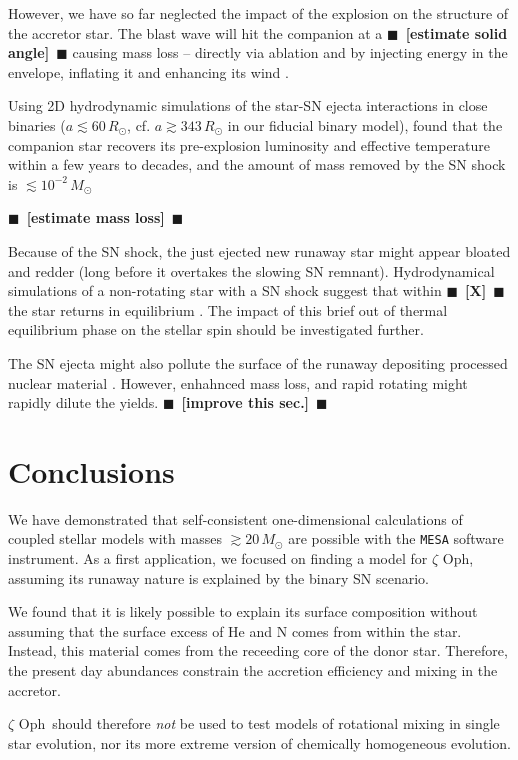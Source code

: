\documentclass[twocolumn,twocolappendix,trackchanges]{aastex63}
\newcommand{\zoph}{$\zeta$ Oph}
\newcommand{\todo}[1]{{\large $\blacksquare$~\textbf{\color{red}[#1]}}~$\blacksquare$}
\begin{document}
However, we have so far neglected the impact of the explosion on the
structure of the accretor star. The blast wave will hit the companion
at a \todo{estimate solid angle} causing mass loss -- directly via
ablation and by injecting energy in the envelope, inflating it and
enhancing its wind \citep{wheeler:75, tauris:98, podsiadlowski:03, hirai:18}.

Using 2D hydrodynamic simulations of the star-SN ejecta interactions
in close binaries ($a\lesssim 60\,R_\odot$,
cf. $a\gtrsim 343\,R_\odot$ in our fiducial binary model),
\cite{hirai:18} found that the companion star recovers its pre-explosion
luminosity and effective temperature within a few years to decades,
and the amount of mass removed by the SN shock is $\lesssim10^{-2}\,M_\odot$



\todo{estimate mass loss}


Because of the SN shock, the just ejected new runaway star might
appear bloated and redder (long before it overtakes the slowing SN
remnant). Hydrodynamical simulations of a non-rotating star
with a SN shock suggest that within \todo{X} the star returns
in equilibrium \cite{hirai:18}. The impact of this brief out of
thermal equilibrium phase on the stellar spin should be investigated
further.

The SN ejecta might also pollute the surface of the runaway depositing
processed nuclear material \citep[e.g.][]{przybilla:08}. However,
enhahnced mass loss, and rapid rotating might rapidly dilute the
yields.
\todo{improve this sec.}
\section{Conclusions}
\label{sec:conclusions}

We have demonstrated that self-consistent one-dimensional calculations
of coupled stellar models with masses $\gtrsim 20\,M_\odot$ are
possible with the \texttt{MESA} software instrument. As a first
application, we focused on finding a model for \zoph, assuming its
runaway nature is explained by the binary SN scenario.

We found that it is likely possible to explain its surface composition
without assuming that the surface excess of He and N comes from within
the star. Instead, this material comes from the receeding core of the
donor star. Therefore, the present day abundances constrain the
accretion efficiency and mixing in the accretor.

\zoph\ should therefore \emph{not} be used to test models of
rotational mixing in single star evolution, nor its more extreme
version of chemically homogeneous evolution.
\end{document}
